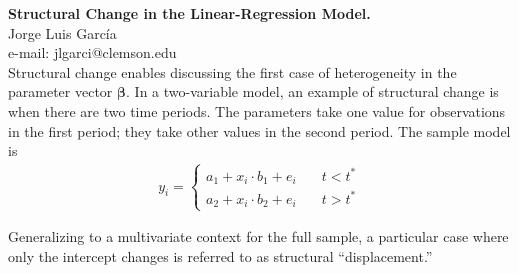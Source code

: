 
\let\counterwithout\relax
\let\counterwithin\relax
{}



\noindent \textbf{Structural Change in the Linear-Regression Model.}\\
\noindent Jorge Luis García \\
\noindent e-mail: jlgarci@clemson.edu\\

\noindent Structural change enables discussing the first case of heterogeneity in the parameter vector $\bm{\beta}$. In a two-variable model, an example of structural change is when there are two time periods. The parameters take one value for observations in the first period; they take other values in the second period. The sample model is 
\begin{align}
	y_i = \left\{
        \begin{array}{ll}
            a_1 + x_i \cdot b_1 + e_{i} & \quad t < t^* \\
            a_2 + x_i \cdot b_2 + e_{i} & \quad t > t^*
        \end{array}
    \right.
\end{align}

\noindent Generalizing to a multivariate context for the full sample, a particular case where only the intercept changes is referred to as structural ``displacement.''

